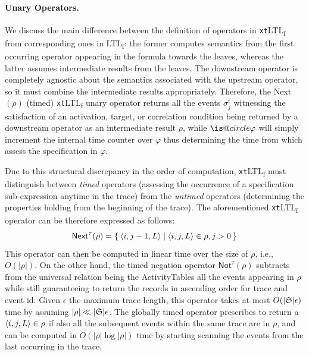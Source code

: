 \documentclass[sigconf]{acmart}
\makeatletter
\DeclareRobustCommand{\iscircle}{\mathord{\mathpalette\is@circle\relax}}
\newcommand\is@circle[2]{%
  \begingroup
  \sbox\z@{\raisebox{\depth}{$\m@th#1\bigcirc$}}%
  \sbox\tw@{$#1\square$}%
  \resizebox{!}{\ht\tw@}{\usebox{\z@}}%
  \endgroup
}
\newcommand{\Next}{\ensuremath{\iscircle}}
\makeatother
\begin{document}
\paragraph{Unary Operators.} We discuss the main difference between the definition of operators in  \texttt{xt}LTL\textsubscript{f} from corresponding ones in LTL\textsubscript{f}: the former computes semantics from the first occurring operator appearing in the formula towards the leaves, whereas the latter assumes intermediate results from the leaves.  The downstream operator is completely agnostic about the semantics associated with the upstream operator, so it must combine the intermediate results appropriately. Therefore, the \textsf{Next}$(\rho)$ (timed) \texttt{xt}LTL\textsubscript{f} unary operator returns all the events $\sigma^i_j$ witnessing the satisfaction of an activation, target, or correlation condition being returned by a downstream operator as an intermediate result $\rho$, while $\Next\varphi$ will simply increment the internal time counter over $\varphi$ thus determining the time from which assess the specification in $\varphi$.

Due to this structural discrepancy in the order of computation, \texttt{xt}LTL\textsubscript{f} must distinguish between \textit{timed} operators (assessing the occurrence of a specification sub-expression anytime in the trace) from the \textit{untimed} operators (determining the properties holding from the beginning of the trace). The aforementioned \texttt{xt}LTL\textsubscript{f} operator can be therefore expressed as follows:
\[\textsf{Next}^\tau(\rho)=\Set{\braket{i,j-1,L}|\braket{i,j,L}\in\rho,j>0}\]
This operator can then be computed in linear time over the size of $\rho$, i.e., $O(|\rho|)$.
On the other hand, the timed negation operator $\textsf{Not}^\tau(\rho)$ subtracts from the universal relation being the \textsf{ActivityTables} all the events appearing in $\rho$ while still guaranteeing to return the records in ascending order for trace and event id. Given $\epsilon$ the maximum trace length, this operator takes at most $O(|\mathfrak{S}|\epsilon)$ time by assuming $|\rho|\ll |\mathfrak{S}|\epsilon$. The globally timed operator prescribes to return a $\braket{i,j,L}\in\rho$ if also all the subsequent events within the same trace are in $\rho$, and can be computed in $O(|\rho| \log|\rho|)$ time by starting scanning the events from the last occurring in the trace.  
\end{document}
